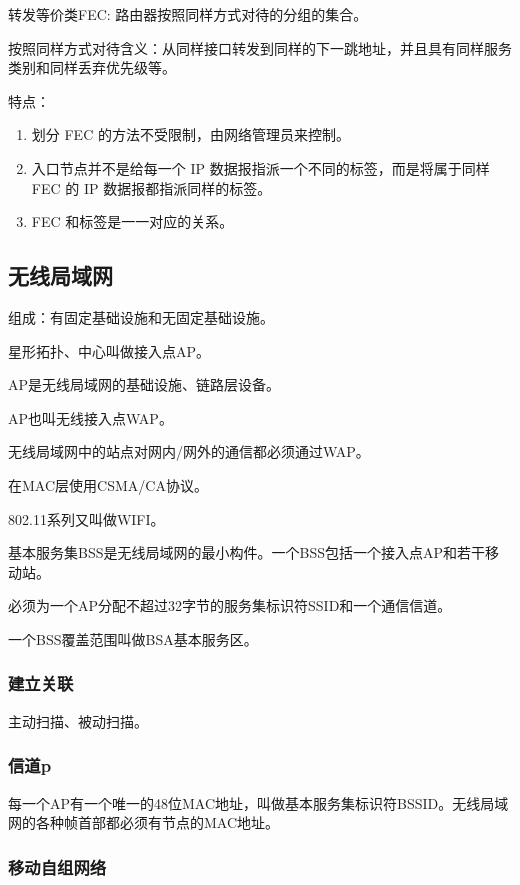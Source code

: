 \documentclass[11pt]{article}
\begin{document}
\begin{enumerate}
\begin{enumerate}
转发等价类FEC: 路由器按照同样方式对待的分组的集合。

按照同样方式对待含义：从同样接口转发到同样的下一跳地址，并且具有同样服务类别和同样丢弃优先级等。

特点：
\begin{enumerate}
\item 划分 FEC 的方法不受限制，由网络管理员来控制。
\item 入口节点并不是给每一个 IP 数据报指派一个不同的标签，而是将属于同样 FEC 的 IP 数据报都指派同样的标签。
\item FEC 和标签是一一对应的关系。
\end{enumerate}
\end{enumerate}
\end{enumerate}

\subsection{无线局域网}
\label{sec:org4f9b6ea}
组成：有固定基础设施和无固定基础设施。

星形拓扑、中心叫做接入点AP。

AP是无线局域网的基础设施、链路层设备。

AP也叫无线接入点WAP。

无线局域网中的站点对网内/网外的通信都必须通过WAP。

在MAC层使用CSMA/CA协议。

802.11系列又叫做WIFI。

基本服务集BSS是无线局域网的最小构件。一个BSS包括一个接入点AP和若干移动站。

必须为一个AP分配不超过32字节的服务集标识符SSID和一个通信信道。

一个BSS覆盖范围叫做BSA基本服务区。

\subsubsection{建立关联}
\label{sec:org9be29bc}
主动扫描、被动扫描。

\subsubsection{信道p}
\label{sec:orgf9817d0}
每一个AP有一个唯一的48位MAC地址，叫做基本服务集标识符BSSID。无线局域网的各种帧首部都必须有节点的MAC地址。

\subsubsection{移动自组网络}
\label{sec:orgde96c52}
\end{document}
